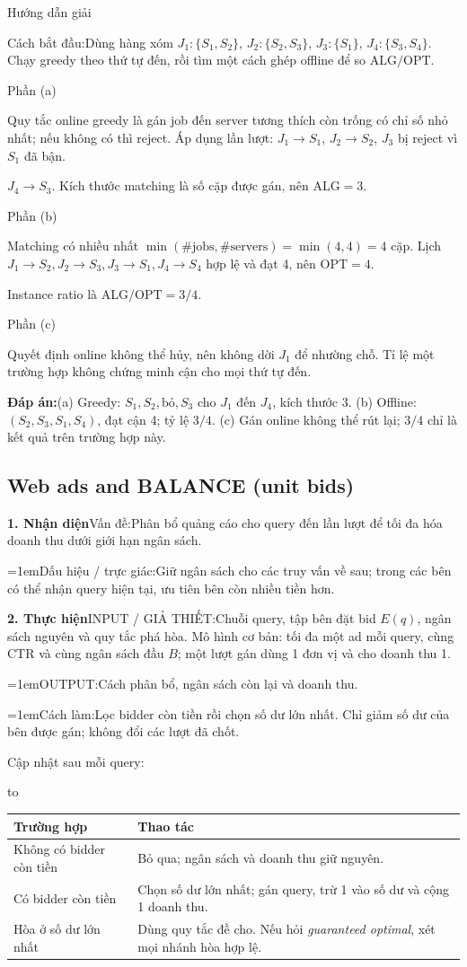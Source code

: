 \documentclass[10pt,a4paper,twocolumn]{article}
\makeatletter
\newcommand{\maptag}[1]{\phantomsection\@bsphack\protected@write\@auxout{}{\string\newlabel{#1}{{}{\thepage}{}{\@currentHref}{}}}\@esphack}
\newif\ifexamheadingprinted
\newcommand{\topic}[2]{%
  \global\examheadingprintedfalse\par\subsection{#2}\label{topic:#1}}
\newcommand{\key}[1]{#1:\enspace}
\newcommand{\solutionprompt}[1]{\par\addvspace{1pt}\noindent\key{Cách bắt đầu}#1\par\addvspace{2pt}}
\newcommand{\blocklabel}[1]{\par\noindent#1\par\nobreak}
\newcommand{\answer}[1]{%
  \par\addvspace{3pt}%
  \blocklabel{#1Hướng dẫn giải}}
\newcommand{\finalanswer}[1]{%
  \par\addvspace{3pt}\noindent\textbf{Đáp án:}\nobreak\enspace#1\par}
\newcommand{\guidepart}[1]{%
  \par\addvspace{1.5pt}%
  \blocklabel{Phần #1}}
\newenvironment{examtable}[1]{%
  \par\addvspace{2pt}\noindent\hbox to \linewidth\bgroup\hfil
  \setlength{\tabcolsep}{4pt}%
  \renewcommand{\arraystretch}{1.12}\begin{tabular}{#1}%
}{\end{tabular}\hfil\egroup\par\addvspace{2pt}}
\newcommand{\algfield}[2]{\par\noindent\hangindent=1em\relax#1:\enspace#2}
\newcommand{\unitfield}[4]{%
  \par\noindent\textbf{#1. #2}\enspace #3:\enspace #4}
\newcommand{\algsummary}[6]{%
  \begingroup\setlength{\parskip}{1pt}%
  \unitfield{1}{Nhận diện}{Vấn đề}{#1}%
  \algfield{Dấu hiệu / trực giác}{#2}%
  \if\relax\detokenize{#3}\relax\else\par\noindent#3\par\fi%
  \unitfield{2}{Thực hiện}{INPUT / GIẢ THIẾT}{#4}%
  \algfield{OUTPUT}{#5}%
  \algfield{Cách làm}{#6}\par\endgroup}
\makeatother
\begin{document}
\answer{\maptag{answer:Pr27}}
\solutionprompt{Dùng hàng xóm $J_1:\{S_1,S_2\}$, $J_2:\{S_2,S_3\}$, $J_3:\{S_1\}$, $J_4:\{S_3,S_4\}$. Chạy greedy theo thứ tự đến, rồi tìm một cách ghép offline để so $\mathrm{ALG}/\mathrm{OPT}$.}
\guidepart{(a)}
\begin{guidesteps}
\item Quy tắc online greedy là gán job đến server tương thích còn trống có chỉ số nhỏ nhất; nếu không có thì reject. Áp dụng lần lượt: $J_1\to S_1$, $J_2\to S_2$, $J_3$ bị reject vì $S_1$ đã bận.
\item $J_4\to S_3$. Kích thước matching là số cặp được gán, nên $\mathrm{ALG}=3$.
\end{guidesteps}
\guidepart{(b)}
\begin{guidesteps}
\item Matching có nhiều nhất $\min(\#\text{jobs},\#\text{servers})=\min(4,4)=4$ cặp. Lịch $J_1\to S_2,J_2\to S_3,J_3\to S_1,J_4\to S_4$ hợp lệ và đạt 4, nên $\mathrm{OPT}=4$.
\item Instance ratio là $\mathrm{ALG}/\mathrm{OPT}=3/4$.
\end{guidesteps}
\guidepart{(c)}
\begin{guidesteps}
\item Quyết định online không thể hủy, nên không dời $J_1$ để nhường chỗ. Tỉ lệ một trường hợp không chứng minh cận cho mọi thứ tự đến.
\end{guidesteps}
\finalanswer{(a) Greedy: $S_1,S_2,\text{bỏ},S_3$ cho $J_1$ đến $J_4$, kích thước 3. (b) Offline: $(S_2,S_3,S_1,S_4)$, đạt cận 4; tỷ lệ $3/4$. (c) Gán online không thể rút lại; $3/4$ chỉ là kết quả trên trường hợp này.}
\topic{balance}{Web ads and BALANCE (unit bids)}

\algsummary{Phân bổ quảng cáo cho query đến lần lượt để tối đa hóa doanh thu dưới giới hạn ngân sách.}{Giữ ngân sách cho các truy vấn về sau; trong các bên có thể nhận query hiện tại, ưu tiên bên còn nhiều tiền hơn.}{}{Chuỗi query, tập bên đặt bid $E(q)$, ngân sách nguyên và quy tắc phá hòa. Mô hình cơ bản: tối đa một ad mỗi query, cùng CTR và cùng ngân sách đầu $B$; một lượt gán dùng 1 đơn vị và cho doanh thu 1.}{Cách phân bổ, ngân sách còn lại và doanh thu.}{Lọc bidder còn tiền rồi chọn số dư lớn nhất. Chỉ giảm số dư của bên được gán; không đổi các lượt đã chốt.}

\key{Cập nhật sau mỗi query}
\begin{examtable}{@{}p{}p{}@{}}
\toprule
Trường hợp & Thao tác \\
\midrule
Không có bidder còn tiền & Bỏ qua; ngân sách và doanh thu giữ nguyên. \\
Có bidder còn tiền & Chọn số dư lớn nhất; gán query, trừ 1 vào số dư và cộng 1 doanh thu. \\
Hòa ở số dư lớn nhất & Dùng quy tắc đề cho. Nếu hỏi \textit{guaranteed optimal}, xét mọi nhánh hòa hợp lệ. \\
\bottomrule
\end{examtable}
\end{document}
